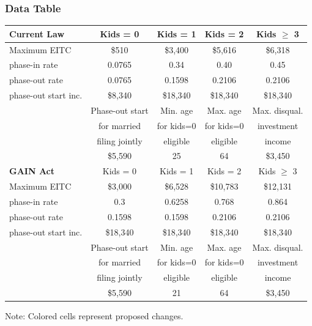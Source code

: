 \documentclass{beamer}
\begin{document}
  \begin{frame}
  \frametitle{Data Table}
    \begin{threeparttable}
    \begin{tabular}{>{\scriptsize}l |>{\scriptsize}c >{\scriptsize}c >{\scriptsize}c >{\scriptsize}c}
      \hline\hline
      \textbf{Current Law} & Kids = 0 & Kids = 1 & Kids = 2 & Kids $\geq$ 3 \\
      \hline
      Maximum EITC        & \$510 & \$3,400 & \$5,616 & \$6,318 \\[-1mm]
      phase-in rate       & 0.0765 & 0.34 & 0.40 & 0.45 \\[-1mm]
      phase-out rate      & 0.0765 & 0.1598 & 0.2106 & 0.2106 \\[-1mm]
      phase-out start inc. & \$8,340 & \$18,340 & \$18,340 & \$18,340 \\[-1mm]
      \hline
      & Phase-out start & Min. age & Max. age & Max. disqual. \\[-2mm]
      & for married & for kids=0 & for kids=0 & investment \\[-2mm]
      & filing jointly & eligible & eligible & income \\[-1mm]
      & \$5,590 & 25 & 64 & \$3,450 \\[-1mm]
      \hline\hline
      \textbf{GAIN Act} & Kids = 0 & Kids = 1 & Kids = 2 & Kids $\geq$ 3 \\
      \hline
      Maximum EITC        & \cellcolor{yellow}\$3,000 & \cellcolor{yellow}\$6,528 & \cellcolor{yellow}\$10,783 & \cellcolor{yellow}\$12,131 \\[-1mm]
      phase-in rate       & \cellcolor{yellow}0.3 & \cellcolor{yellow}0.6258 & \cellcolor{yellow}0.768 & \cellcolor{yellow}0.864 \\[-1mm]
      phase-out rate      & \cellcolor{yellow}0.1598 & 0.1598 & 0.2106 & 0.2106 \\[-1mm]
      phase-out start inc. & \cellcolor{yellow}\$18,340 & \$18,340 & \$18,340 & \$18,340 \\[-1mm]
      \hline
      & Phase-out start & Min. age & Max. age & Max. disqual. \\[-2mm]
      & for married & for kids=0 & for kids=0 & investment \\[-2mm]
      & filing jointly & eligible & eligible & income \\[-1mm]
      & \$5,590 & \cellcolor{yellow} 21 & 64 & \$3,450 \\[-1mm]
      \hline\hline
    \end{tabular}
    \begin{tablenotes}
      \scriptsize{\item[]Note: Colored cells represent proposed changes.}
    \end{tablenotes}
    \end{threeparttable}
  \end{frame}
\end{document}
